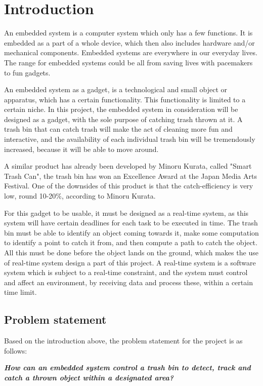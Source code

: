  \chapter{Introduction}
\label{chap:Introduction}
An embedded system is a computer system which only has a few functions. It is embedded as a part of a whole device, which then also includes hardware and/or mechanical components. Embedded systems are everywhere in our everyday lives. The range for embedded systems could be all from saving lives with pacemakers to fun gadgets. \citep{es}

An embedded system as a gadget, is a technological and small object or apparatus, which has a certain functionality. This functionality is limited to a certain niche. \newline
In this project, the embedded system in consideration will be designed as a gadget, with the sole purpose of catching trash thrown at it. A trash bin that can catch trash will make the act of cleaning more fun and interactive, and the availability of each individual trash bin will be tremendously increased, because it will be able to move around.

A similar product has already been developed by Minoru Kurata, called "Smart Trash Can", the trash bin has won an Excellence Award at the Japan Media Arts Festival. One of the downsides of this product is that the catch-efficiency is very low, round 10-20\%, according to Minoru Kurata.  \citep{SmartTrashCan}

For this gadget to be usable, it must be designed as a real-time system, as this system will have certain deadlines for each task to be executed in time. The trash bin must be able to identify an object coming towards it, make some computation to identify a point to catch it from, and then compute a path to catch the object. All this must be done before the object lands on the ground, which makes the use of real-time system design a part of this project. A real-time system is a software system which is subject to a real-time constraint, and the system must control and affect an environment, by receiving data and process these, within a certain time limit. 


\section{Problem statement}
\label{sec:Problem statement}
Based on the introduction above, the problem statement for the project is as follows:

\textbf{\textit{How can an embedded system control a trash bin to detect, track and catch a thrown object within a designated area?}}


